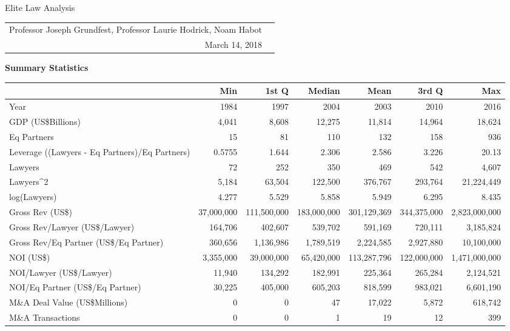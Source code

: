 \documentclass{article}
\begin{document}
\begin{center}{\LARGE Elite Law Analysis}
\\
\begin{tabular}{rl}\\Professor Joseph Grundfest, Professor Laurie Hodrick, Noam Habot \\March 14, 2018\end{tabular}\end{center}{\large \textbf{Summary Statistics} }%
\begin{table}[H]
\centering
\begin{tabular}{lrrrrrr}
  \hline
 & Min & 1st Q & Median & Mean & 3rd Q & Max \\
  \hline
Year & 1984 & 1997 & 2004 & 2003 & 2010 & 2016 \\
  GDP (US\$Billions) & 4,041 & 8,608 & 12,275 & 11,814 & 14,964 & 18,624 \\
  Eq Partners & 15 & 81 & 110 & 132 & 158 & 936 \\
  Leverage ((Lawyers - Eq Partners)/Eq Partners) & 0.5755 & 1.644 & 2.306 & 2.586 & 3.226 & 20.13 \\
  Lawyers & 72 & 252 & 350 & 469 & 542 & 4,607 \\
  Lawyers^2 & 5,184 & 63,504 & 122,500 & 376,767 & 293,764 & 21,224,449 \\
  log(Lawyers) & 4.277 & 5.529 & 5.858 & 5.949 & 6.295 & 8.435 \\
   \hline
Gross Rev (US\$) & 37,000,000 & 111,500,000 & 183,000,000 & 301,129,369 & 344,375,000 & 2,823,000,000 \\
  Gross Rev/Lawyer (US\$/Lawyer) & 164,706 & 402,607 & 539,702 & 591,169 & 720,111 & 3,185,824 \\
  Gross Rev/Eq Partner (US\$/Eq Partner) & 360,656 & 1,136,986 & 1,789,519 & 2,224,585 & 2,927,880 & 10,100,000 \\
  NOI (US\$) & 3,355,000 & 39,000,000 & 65,420,000 & 113,287,796 & 122,000,000 & 1,471,000,000 \\
  NOI/Lawyer (US\$/Lawyer) & 11,940 & 134,292 & 182,991 & 225,364 & 265,284 & 2,124,521 \\
  NOI/Eq Partner (US\$/Eq Partner) & 30,225 & 405,000 & 605,203 & 818,599 & 983,021 & 6,601,190 \\
   \hline
M\&A Deal Value (US\$Millions) & 0 & 0 & 47 & 17,022 & 5,872 & 618,742 \\
  M\&A Transactions & 0 & 0 & 1 & 19 & 12 & 399 \\

\end{tabular}
\end{table}
\end{document}
